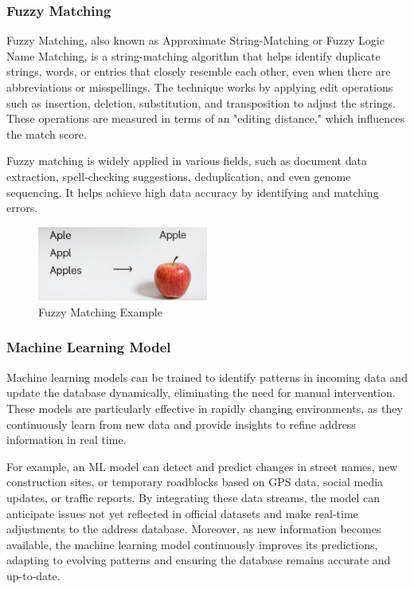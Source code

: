         \subsubsection{Fuzzy Matching}
        Fuzzy Matching, also known as Approximate String-Matching or Fuzzy Logic Name Matching, is a string-matching algorithm that helps identify duplicate strings, words, or entries that closely resemble each other, even when there are abbreviations or misspellings. The technique works by applying edit operations such as insertion, deletion, substitution, and transposition to adjust the strings. These operations are measured in terms of an "editing distance," which influences the match score.\blankLine
        
        Fuzzy matching is widely applied in various fields, such as document data extraction, spell-checking suggestions, deduplication, and even genome sequencing. It helps achieve high data accuracy by identifying and matching errors. \autocite{Nieters2024Dec}

        \begin{figure}[H]
            \centering
            \includegraphics[width=0.5\textwidth]{images/AdminPanel/FuzzyMatching.png}
            \caption{Fuzzy Matching Example}
            \label{fig:fuzzy-matching}
        \end{figure}
        
        \subsubsection{Machine Learning Model}
        Machine learning models can be trained to identify patterns in incoming data and update the database dynamically, eliminating the need for manual intervention. These models are particularly effective in rapidly changing environments, as they continuously learn from new data and provide insights to refine address information in real time.\blankLine

        For example, an ML model can detect and predict changes in street names, new construction sites, or temporary roadblocks based on GPS data, social media updates, or traffic reports. By integrating these data streams, the model can anticipate issues not yet reflected in official datasets and make real-time adjustments to the address database. Moreover, as new information becomes available, the machine learning model continuously improves its predictions, adapting to evolving patterns and ensuring the database remains accurate and up-to-date. \autocite{Encora2023Nov}
        
